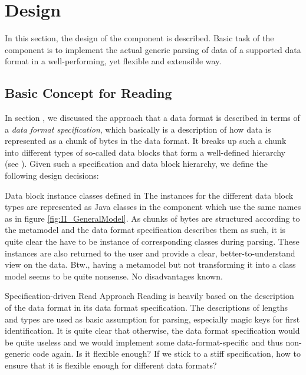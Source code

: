 
\section{\COMPdataPartManagement{} Design}
\label{sec:COMPdataBlockManagementDesign}

In this section, the design of the component \COMPdataPartManagement{} is described. Basic task of the component is to implement the actual generic parsing of data of a supported data format in a well-performing, yet flexible and extensible way.
\subsection{Basic Concept for Reading}%
\label{sec:BasicConceptforReading}%

In section , we discussed the approach that a data format is described in terms of a \emph{data format specification}, which basically is a description of how data is represented as a chunk of bytes in the data format. It breaks up such a chunk into different types of so-called data blocks that form a well-defined hierarchy (see ). Given such a specification and data block hierarchy, we define the following design decisions:

{%
Data block instance classes defined in \COMPdataPartManagement{}
}
{%
The instances for the different data block types are represented as Java classes in the \COMPdataPartManagement{} component which use the same names as in figure \ref{fig:II_GeneralModel}.
}
{%
As chunks of bytes are structured according to the metamodel and the data format specification describes them as such, it is quite clear the have to be instance of corresponding classes during parsing. These instances are also returned to the user and provide a clear, better-to-understand view on the data. Btw., having a metamodel but not transforming it into a class model seems to be quite nonsense.
}
{%
No disadvantages known.
}

{%
Specification-driven Read Approach
}
{%
Reading is heavily based on the description of the data format in its data format specification. The descriptions of lengths and types are used as basic assumption for parsing, especially magic keys for first identification.
}
{%
It is quite clear that otherwise, the data format specification would be quite useless and we would implement some data-format-specific and thus non-generic code again.
}
{%
Is it flexible enough? If we stick to a stiff specification, how to ensure that it is flexible enough for different data formats?
}

